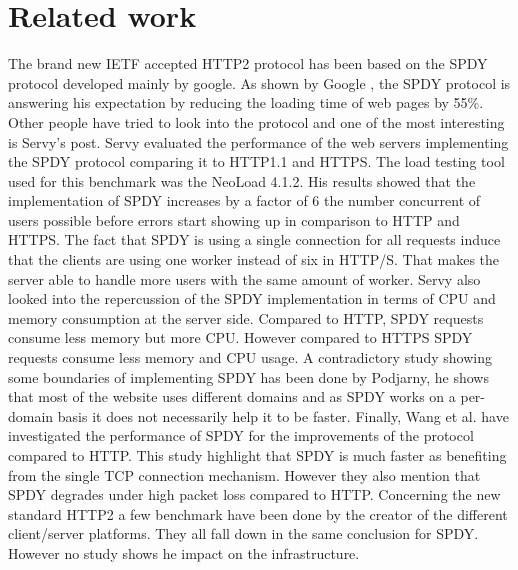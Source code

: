\section{Related work}
\label{relwork}
The brand new IETF accepted HTTP2 protocol has been based on the SPDY protocol developed mainly by google. As shown by Google \cite{Google2x}, the SPDY protocol is answering his expectation by reducing the loading time of web pages by 55\%. Other people have tried to look into the protocol and one of the most interesting is Servy's post. Servy evaluated the performance of the web servers implementing the SPDY protocol comparing it to HTTP1.1 and HTTPS. The load testing tool used for this benchmark was the NeoLoad 4.1.2. His results showed that the implementation of SPDY increases by a factor of 6 the number concurrent of users possible before errors start showing up in comparison to HTTP and HTTPS. The fact that SPDY is using a single connection for all requests induce that the clients are using one worker instead of six in HTTP/S. That makes the server able to handle more users with the same amount of worker. Servy also looked into the repercussion of the SPDY implementation in terms of CPU and memory consumption at the server side. Compared to HTTP, SPDY requests consume less memory but more CPU. However compared to HTTPS SPDY requests consume less memory and CPU usage.
A contradictory study showing some boundaries of implementing SPDY has been done by Podjarny\cite{podiatry}, he shows that most of the website uses different domains and as SPDY works on a per-domain basis it does not necessarily help it to be faster. Finally, Wang et al.\cite{wang} have investigated the performance of SPDY for the improvements of the protocol compared to HTTP. This study highlight that SPDY is much faster as benefiting from the single TCP connection mechanism. However they also mention that SPDY degrades under high packet loss compared to HTTP. 
Concerning the new standard HTTP2 a few benchmark have been done by the creator of the different client/server platforms. They all fall down in the same conclusion for SPDY. However no study shows he impact on the infrastructure.
